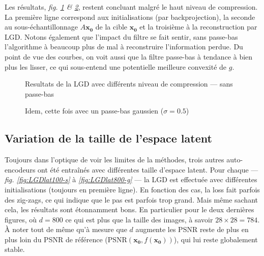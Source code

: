 \documentclass[hidelinks, french]{article} %
\renewcommand{\bf}[1]{\boldsymbol{#1}}
\theoremstyle{enonce}
\theoremstyle{special}
\theoremstyle{rq}
\theoremstyle{exo}
\theoremstyle{demo}
\begin{document}
Les résultats, \textit{fig. \ref{fig:LGDsizes-s} \& \ref{fig:LGDsizes-g}}, restent concluant malgré le haut niveau de compression. La première ligne correspond aux initialisations (par backprojection), la seconde au sous-échantillonnage $A\bf{x_0}$ de la cible $\bf{x_0}$ et la troisième à la reconstruction par LGD. Notons également que l'impact du filtre se fait sentir, sans passe-bas l'algorithme à beaucoup plus de mal à reconstruire l'information perdue. Du point de vue des courbes, on voit aussi que la filtre passe-bas à tendance à bien plus les lisser, ce qui sous-entend une potentielle meilleure convexité de $g$.

\begin{figure}[H]\centering
	
	\caption{Resultats de la LGD avec différents niveau de compression --- sans passe-bas}
	\label{fig:LGDsizes-s}
\end{figure}

\begin{figure}[H]\centering
	
	\caption{Idem, cette fois avec un passe-bas gaussien ($\sigma=0.5$)}
	\label{fig:LGDsizes-g}
\end{figure}



\subsection{Variation de la taille de l'espace latent}\label{sec:LGDlat}

Toujours dans l'optique de voir les limites de la méthodes, trois autres auto-encodeurs ont été entraînés avec différentes taille d'espace latent. Pour chaque --- \textit{fig. \ref{fig:LGDlat100-s}} à \textit{ \ref{fig:LGDlat800-g}} --- la LGD est effectuée avec différentes initialisations (toujours en première ligne). En fonction des cas, la loss fait parfois des zig-zags, ce qui indique que le pas est parfois trop grand. Mais même sachant cela, les résultats sont étonnamment bons. En particulier pour le deux dernières figures, où $d=800$ ce qui est plus que la taille des images, à savoir $28\times28=784$. \`A noter tout de même qu'à mesure que $d$ augmente les PSNR reste de plus en plus loin du PSNR de référence (PSNR$(\bf{x_0}, f(\bf{x_0}))$), qui lui reste globalement stable.
\\

\newpage
\end{document}
